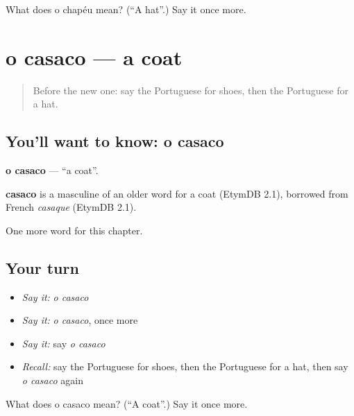\begin{tcolorbox}[breakable,colback=teal!4,colframe=teal!35!black,title={Before you move on}]
What does o chapéu mean? (\textquotedblleft{}A hat\textquotedblright{}.) Say it once more.
\end{tcolorbox}
\section[o casaco]{o casaco — a coat}

\label{lesson:PT-C78-casaco}



\begin{quote}
Before the new one: say the Portuguese for shoes, then the Portuguese for a hat.
\end{quote}

\subsection*{You'll want to know: o casaco}
\textbf{o casaco} — \textquotedblleft{}a coat\textquotedblright{}.

\begin{cousinweb}
\textbf{casaco} is a masculine of an older word for a coat (EtymDB 2.1), borrowed from French \emph{casaque} (EtymDB 2.1).
\end{cousinweb}

\begin{grammarlens}[title={What you've built}]
One more word for this chapter.
\end{grammarlens}

\subsection*{Your turn}
\begin{itemize}
\raggedright
  \item \emph{Say it:} \emph{o casaco}
  \item \emph{Say it:} \emph{o casaco}, once more
  \item \emph{Say it:} say \emph{o casaco}
  \item \emph{Recall:} say the Portuguese for shoes, then the Portuguese for a hat, then say \emph{o casaco} again
\end{itemize}

\begin{tcolorbox}[breakable,colback=teal!4,colframe=teal!35!black,title={Before you move on}]
What does o casaco mean? (\textquotedblleft{}A coat\textquotedblright{}.) Say it once more.
\end{tcolorbox}
